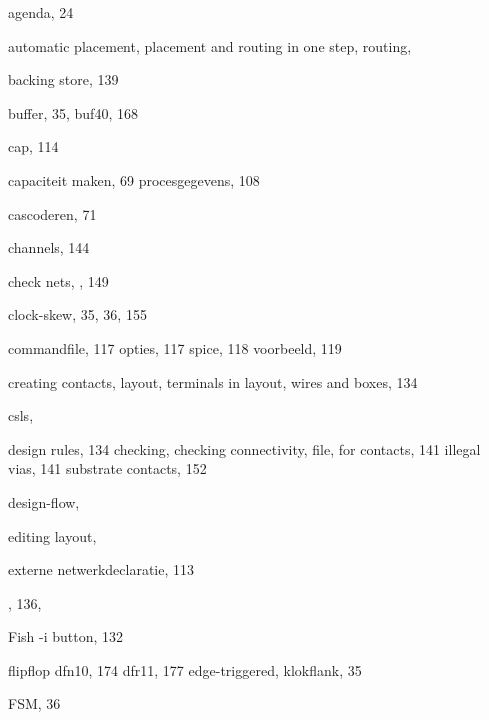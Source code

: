 \begin{theindex}

  \item agenda, 24
  \item automatic
    \subitem placement, 
    \subitem placement and routing in one step, 
    \subitem routing, 

  \indexspace

  \item backing store, 139
  \item buffer, 35, 
    \subitem buf40, 168

  \indexspace

  \item cap, 114
  \item capaciteit
    \subitem maken, 69
    \subitem procesgegevens, 108
  \item cascoderen, 71
  \item channels, 144
  \item check nets, , 149
  \item clock-skew, 35, 36, 155
  \item commandfile, 117
    \subitem opties, 117
    \subitem spice, 118
    \subitem voorbeeld, 119
  \item creating
    \subitem contacts, 
    \subitem layout, 
    \subitem terminals in layout, 
    \subitem wires and boxes, 134
  \item csls, 

  \indexspace

  \item design rules, 134
    \subitem checking, 
    \subitem checking connectivity, 
    \subitem file, 
    \subitem for contacts, 141
    \subitem illegal vias, 141
    \subitem substrate contacts, 152
  \item design-flow, 

  \indexspace

  \item editing layout, 
  \item externe netwerkdeclaratie, 113

  \indexspace

  \item {}, 136, 
  \item Fish -i button, 132
  \item flipflop
    \subitem dfn10, 174
    \subitem dfr11, 177
    \subitem edge-triggered, 
    \subitem klokflank, 35
  \item FSM, 36


\end{theindex}
